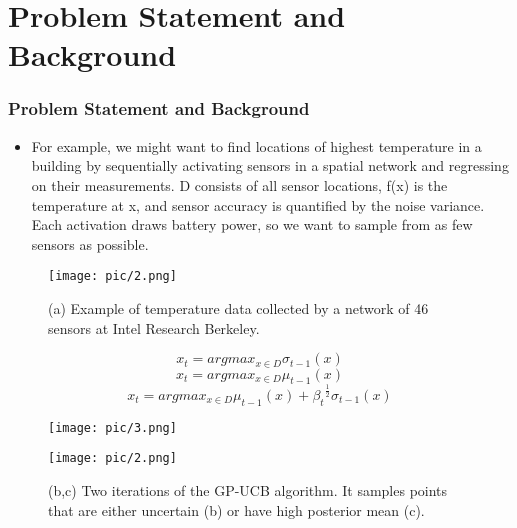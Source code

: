 \documentclass[10pt]{beamer}
\begin{document}
\section{Problem Statement and Background}
\begin{frame}
\frametitle{Problem Statement and Background}
    \begin{itemize}
        \item For example, we might want to find locations of highest temperature in a building by sequentially activating sensors in a spatial network and regressing on their measurements. D consists of all sensor locations, f(x) is the temperature at x, and sensor  accuracy  is  quantified  by  the  noise  variance. Each  activation  draws  battery  power,  so  we  want  to sample from as few sensors as possible.
    \end{itemize}
\end{frame}

\begin{frame}
    \begin{figure}
        \texttt{[image: pic/2.png]}
        \caption{(a) Example of temperature data collected by a network of 46 sensors at Intel Research Berkeley.}
    \end{figure}
\end{frame}

\begin{frame}
    \begin{equation}
        x_{t}=argmax_{x\in D}\sigma_{t-1}(x)
    \end{equation}
    \begin{equation}
        x_{t}=argmax_{x\in D}\mu_{t-1}(x)
    \end{equation}
    \begin{equation}
        x_{t}=argmax_{x\in D}\mu_{t-1}(x)+{\beta_{t}}^{\frac{1}{2}}\sigma_{t-1}(x)
    \end{equation}
\end{frame}

\begin{frame}
    \begin{figure}
        \texttt{[image: pic/3.png]}
    \end{figure}
\end{frame}

\begin{frame}
    \begin{figure}
        \texttt{[image: pic/2.png]}
        \caption{ (b,c) Two iterations of the GP-UCB algorithm.  It samples points that are either uncertain (b) or have high posterior mean (c).}
    \end{figure}
\end{frame}
\end{document}
